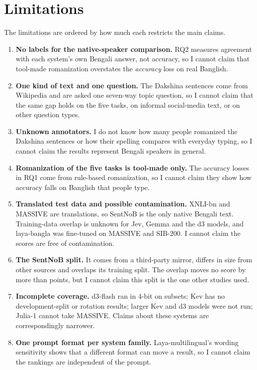 \documentclass[11pt]{article}
\begin{document}
\section{Limitations}
\label{sec:limits}
The limitations are ordered by how much each restricts the main claims.
\begin{enumerate}
\item \textbf{No labels for the native-speaker comparison.} RQ2 measures agreement with each system's own Bengali answer, not accuracy, so I cannot claim that tool-made romanization overstates the \emph{accuracy} loss on real Banglish.
\item \textbf{One kind of text and one question.} The Dakshina sentences come from Wikipedia and are asked one seven-way topic question, so I cannot claim that the same gap holds on the five tasks, on informal social-media text, or on other question types.
\item \textbf{Unknown annotators.} I do not know how many people romanized the Dakshina sentences or how their spelling compares with everyday typing, so I cannot claim the results represent Bengali speakers in general.
\item \textbf{Romanization of the five tasks is tool-made only.} The accuracy losses in RQ1 come from rule-based romanization, so I cannot claim they show how accuracy falls on Banglish that people type.
\item \textbf{Translated test data and possible contamination.} XNLI-bn and MASSIVE are translations, so SentNoB is the only native Bengali text. Training-data overlap is unknown for Jev, Gemma and the d3 models, and laya-bangla was fine-tuned on MASSIVE and SIB-200. I cannot claim the scores are free of contamination.
\item \textbf{The SentNoB split.} It comes from a third-party mirror, differs in size from other sources and overlaps its training split. The overlap moves no score by more than \snMaxShift{} points, but I cannot claim this split is the one other studies used.
\item \textbf{Incomplete coverage.} d3-flash ran in 4-bit on subsets; Kev has no development-split or rotation results; larger Kev and d3 models were not run; Julia-1 cannot take MASSIVE. Claims about these systems are correspondingly narrower.
\item \textbf{One prompt format per system family.} Laya-multilingual's wording sensitivity shows that a different format can move a result, so I cannot claim the rankings are independent of the prompt.
\end{enumerate}
\end{document}
